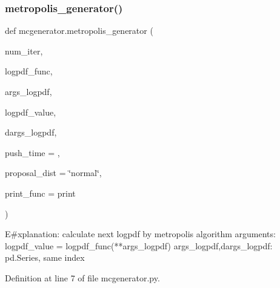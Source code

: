\subsubsection{\texorpdfstring{metropolis\+\_\+generator()}{metropolis\_generator()}}
{\footnotesize\ttfamily def mcgenerator.\+metropolis\+\_\+generator (\begin{DoxyParamCaption}\item[{}]{num\+\_\+iter,  }\item[{}]{logpdf\+\_\+func,  }\item[{}]{args\+\_\+logpdf,  }\item[{}]{logpdf\+\_\+value,  }\item[{}]{dargs\+\_\+logpdf,  }\item[{}]{push\+\_\+time = {},  }\item[{}]{proposal\+\_\+dist = {\ttfamily \char`\"{}normal\char`\"{}},  }\item[{}]{print\+\_\+func = {\ttfamily print} }\end{DoxyParamCaption})}

\begin{DoxyVerb}E#xplanation: calculate next logpdf by metropolis algorithm
arguments:
    logpdf_value = logpdf_func(**args_logpdf)
    args_logpdf,dargs_logpdf: pd.Series, same index
\end{DoxyVerb}
 

Definition at line 7 of file mcgenerator.\+py.



